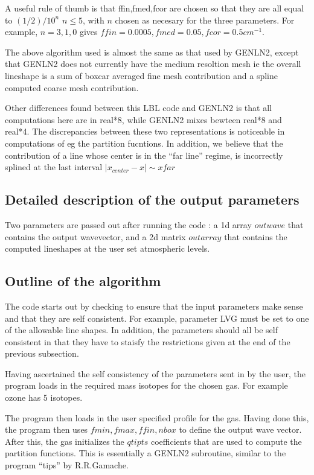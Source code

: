 \documentclass[11pt]{article}
\begin{document}
A useful rule of thumb is that ffin,fmed,fcor are chosen so that they 
are all equal to $(1/2)/10^{n}$   $n \le 5$, with $n$ chosen as necesary for 
the three parameters. For example, $n=3,1,0$ gives $ffin=0.0005,fmed=0.05,
fcor=0.5 cm^{-1}$.

The above algorithm used is almost the same as that used by GENLN2, except 
that GENLN2 does not currently have the medium resoltion mesh ie the overall 
lineshape is a sum of boxcar averaged fine mesh contribution and a spline
computed coarse mesh contribution.

Other differences found between this LBL code and GENLN2 is that all 
computations here are in real*8, while GENLN2 mixes bewteen real*8 and 
real*4. 
The discrepancies between these two representations is noticeable in 
computations of eg the partition fucntions. In addition, we believe that the
contribution of a line whose center is in the ``far line'' regime, is 
incorrectly splined at the last interval $|x_{center} - x| \sim xfar$

\subsection{Detailed description of the output parameters}
Two parameters are passed out after running the code : a 1d array $outwave$ 
that contains the output wavevector, and a 2d matrix $outarray$ that 
contains the computed lineshapes at the user set atmospheric levels.

\subsection{Outline of the algorithm}

The code starts out by checking to ensure that the input parameters make 
sense and that they are self consistent. For example, parameter LVG must 
be set to
one of the allowable line shapes. In addition, the parameters should all be 
self consistent in that they have to staisfy the restrictions given at the 
end of the previous subsection.

Having ascertained the self consistency of the parameters sent in by the 
user, the program loads in the required mass isotopes for the chosen 
gas. For example ozone has 5 isotopes. 

The program then loads in the user specified profile for the gas.
Having done this, the program then uses $fmin,fmax,ffin,nbox$ to define the 
output wave vector. After this, the gas initializes the $qtipts$ 
coefficients that are used to compute the partition functions. This is 
essentially a GENLN2 subroutine, similar to the program ``tips'' by 
R.R.Gamache.
\end{document}

